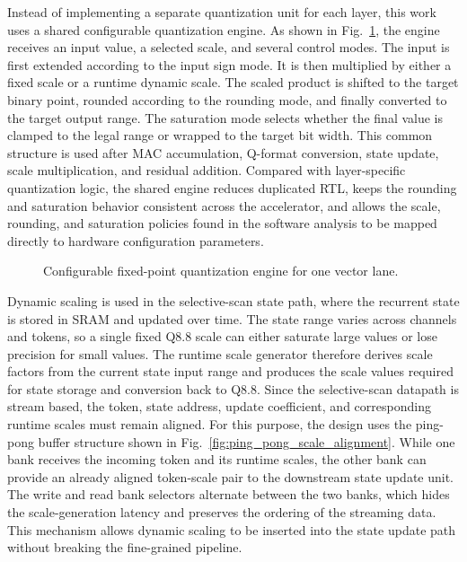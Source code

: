 \documentclass[11pt,twoside]{eitExjobb}
\begin{document}
Instead of implementing a separate quantization unit for each layer, this work uses a
shared configurable quantization engine. As shown in
Fig.~\ref{fig:fixed_point_vector_lane}, the engine receives an input value, a selected
scale, and several control modes. The input is first extended according to the input
sign mode. It is then multiplied by either a fixed scale or a runtime dynamic scale.
The scaled product is shifted to the target binary point, rounded according to the
rounding mode, and finally converted to the target output range. The saturation mode
selects whether the final value is clamped to the legal range or wrapped to the target
bit width. This common structure is used after MAC accumulation, Q-format conversion,
state update, scale multiplication, and residual addition. Compared with layer-specific
quantization logic, the shared engine reduces duplicated RTL, keeps the rounding and
saturation behavior consistent across the accelerator, and allows the scale, rounding,
and saturation policies found in the software analysis to be mapped directly to hardware
configuration parameters.

\begin{figure}[H]
  \centering
  
  \caption{Configurable fixed-point quantization engine for one vector lane.}
  \label{fig:fixed_point_vector_lane}
\end{figure}

Dynamic scaling is used in the selective-scan state path, where the recurrent state is
stored in SRAM and updated over time. The state range varies across channels and tokens,
so a single fixed Q8.8 scale can either saturate large values or lose precision for
small values. The runtime scale generator therefore derives scale factors from the
current state input range and produces the scale values required for state storage and
conversion back to Q8.8. Since the selective-scan datapath is stream based, the token,
state address, update coefficient, and corresponding runtime scales must remain aligned.
For this purpose, the design uses the ping-pong buffer structure shown in
Fig.~\ref{fig:ping_pong_scale_alignment}. While one bank receives the incoming token and
its runtime scales, the other bank can provide an already aligned token-scale pair to
the downstream state update unit. The write and read bank selectors alternate between
the two banks, which hides the scale-generation latency and preserves the ordering of
the streaming data. This mechanism allows dynamic scaling to be inserted into the state
update path without breaking the fine-grained pipeline.
\end{document}
